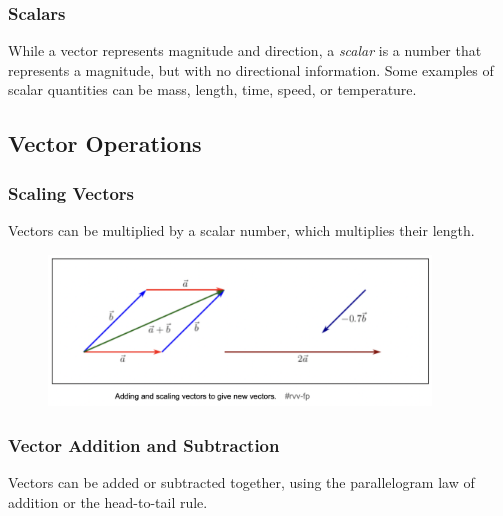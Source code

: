 \subsubsection{Scalars}

While a vector represents magnitude and direction, a \textit{scalar} is a number that represents a magnitude, but with no directional information. Some examples of scalar quantities can be mass, length, time, speed, or temperature. 

\subsection{Vector Operations}

\subsubsection{Scaling Vectors}


Vectors can be multiplied by a scalar number, which multiplies their length. 

\begin{figure}[!h]
\centering
\includegraphics[angle=0, width=4in]{VectorsScalarsFigures/VecScaling.png}
\vspace{-2mm}
\caption{\small {}}
\vspace{-3mm}
\label{Fig:NewtonsLaws}
\end{figure}

\subsubsection{Vector Addition and Subtraction}


Vectors can be added or subtracted together, using the parallelogram law of addition or the head-to-tail rule.

